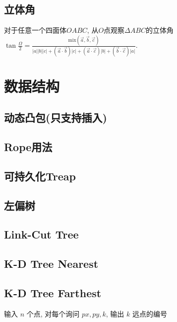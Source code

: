 \documentclass[landscape, twocolumn, 8pt, a4paper, twoside]{extarticle}
\begin{document}
  \subsection{立体角}
    对于任意一个四面体$OABC$,
    从$O$点观察$\Delta ABC$的立体角$\tan{\frac{\Omega}{2}} = 
    \frac{\textrm{mix}(\vec{a}, \vec{b}, \vec{c}) }{
        |a||b||c|
      + (\vec{a} \cdot \vec{b}) |c|
      + (\vec{a} \cdot \vec{c}) |b|
      + (\vec{b} \cdot \vec{c}) |a|
    }$.

\section{数据结构}
  \subsection{动态凸包(只支持插入)}
    
    
  \subsection{Rope用法}
    
  
  \subsection{可持久化Treap}
    
  
  \subsection{左偏树}
    
  
  \subsection{Link-Cut Tree}
    

  \subsection{K-D Tree Nearest}
    

  \subsection{K-D Tree Farthest}
    输入 $n$ 个点, 对每个询问 $px, py, k$, 输出 $k$ 远点的编号
    
\end{document}
